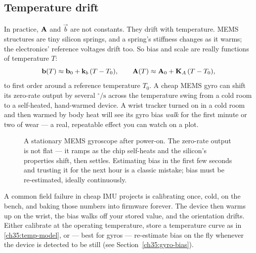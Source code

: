 \subsection{Temperature drift}
\label{ch35:temp}

In practice, $\mathbf{A}$ and $\vec{b}$ are not constants. They
drift with temperature. MEMS structures are tiny silicon springs, and a spring's
stiffness changes as it warms; the electronics' reference voltages drift too. So
bias and scale are really functions of temperature $T$:
\begin{equation}
  \mathbf{b}(T) \approx \mathbf{b}_0 + \mathbf{k}_b\,(T - T_0), \qquad
  \mathbf{A}(T) \approx \mathbf{A}_0 + \mathbf{K}_A\,(T - T_0),
  \label{ch35:temp-model}
\end{equation}
to first order around a reference temperature $T_0$. A cheap MEMS gyro can shift its zero-rate output by several
$^\circ/\mathrm{s}$ across the temperature swing from a cold room to a
self-heated, hand-warmed device. A wrist tracker turned on in a cold room and
then warmed by body heat will see its gyro bias \emph{walk} for the first minute
or two of wear --- a real, repeatable effect you can watch on a plot.

\begin{figure}[H]
\centering
{}
\caption{A stationary MEMS gyroscope after power-on. The zero-rate output is not
flat --- it ramps as the chip self-heats and the silicon's properties shift, then
settles. Estimating bias in the first few seconds and trusting it for the next
hour is a classic mistake; bias must be re-estimated, ideally continuously.}
\label{ch35:fig-warmup}
\end{figure}

\begin{trapbox}
A common field failure in cheap IMU projects is calibrating once,
cold, on the bench, and baking those numbers into firmware forever. The device
then warms up on the wrist, the bias walks off your stored value, and the
orientation drifts. Either calibrate at the operating temperature, store a
temperature curve as in \eqref{ch35:temp-model}, or --- best for gyros ---
re-estimate bias on the fly whenever the device is detected to be still (see
Section~\ref{ch35:gyro-bias}).
\end{trapbox}

